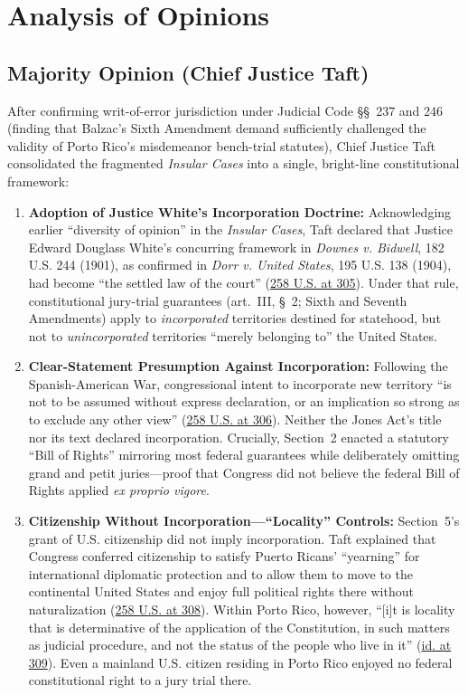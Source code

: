\documentclass[12pt]{article}
\begin{document}
\section{Analysis of Opinions}
\subsection{Majority Opinion (Chief Justice Taft)}

After confirming writ-of-error jurisdiction under Judicial Code \S\S~237 and 246 (finding that Balzac's Sixth Amendment demand sufficiently challenged the validity of Porto Rico's misdemeanor bench-trial statutes), Chief Justice Taft consolidated the fragmented \textit{Insular Cases} into a single, bright-line constitutional framework:

\begin{enumerate}
  \item \textbf{Adoption of Justice White's Incorporation Doctrine:} Acknowledging earlier ``diversity of opinion'' in the \textit{Insular Cases}, Taft declared that Justice Edward Douglass White's concurring framework in \textit{Downes v. Bidwell}, 182 U.S. 244 (1901), as confirmed in \textit{Dorr v. United States}, 195 U.S. 138 (1904), had become ``the settled law of the court'' (\href{https://en.wikisource.org/wiki/Balzac_v._Porto_Rico/Opinion_of_the_Court}{258 U.S. at 305}). Under that rule, constitutional jury-trial guarantees (art.~III, \S~2; Sixth and Seventh Amendments) apply to \textit{incorporated} territories destined for statehood, but not to \textit{unincorporated} territories ``merely belonging to'' the United States.
  \item \textbf{Clear-Statement Presumption Against Incorporation:} Following the Spanish-American War, congressional intent to incorporate new territory ``is not to be assumed without express declaration, or an implication so strong as to exclude any other view'' (\href{https://supreme.justia.com/cases/federal/us/258/298/}{258 U.S. at 306}). Neither the Jones Act's title nor its text declared incorporation. Crucially, Section~2 enacted a statutory ``Bill of Rights'' mirroring most federal guarantees while deliberately omitting grand and petit juries---proof that Congress did not believe the federal Bill of Rights applied \textit{ex proprio vigore}.
  \item \textbf{Citizenship Without Incorporation---``Locality'' Controls:} Section~5's grant of U.S. citizenship did not imply incorporation. Taft explained that Congress conferred citizenship to satisfy Puerto Ricans' ``yearning'' for international diplomatic protection and to allow them to move to the continental United States and enjoy full political rights there without naturalization (\href{https://en.wikisource.org/wiki/Balzac_v._Porto_Rico/Opinion_of_the_Court}{258 U.S. at 308}). Within Porto Rico, however, ``[i]t is locality that is determinative of the application of the Constitution, in such matters as judicial procedure, and not the status of the people who live in it'' (\href{https://supreme.justia.com/cases/federal/us/258/298/}{id. at 309}). Even a mainland U.S. citizen residing in Porto Rico enjoyed no federal constitutional right to a jury trial there.

\end{enumerate}
\end{document}
